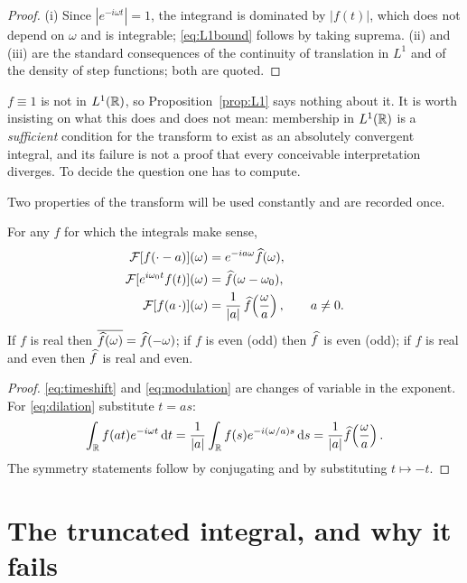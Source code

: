 \begin{proof}
(i) Since $|e^{-i\omega t}|=1$, the integrand is dominated by $|f(t)|$, which does not depend on
$\omega$ and is integrable; \eqref{eq:L1bound} follows by taking suprema. (ii) and (iii) are the
standard consequences of the continuity of translation in $L^{1}$ and of the density of step
functions; both are quoted.
\end{proof}

\begin{example}
$f\equiv 1$ is not in $L^{1}(\mathbb{R})$, so Proposition~\ref{prop:L1} says nothing about it. It is worth
insisting on what this does and does not mean: membership in $L^{1}(\mathbb{R})$ is a \emph{sufficient}
condition for the transform to exist as an absolutely convergent integral, and its failure is not
a proof that every conceivable interpretation diverges. To decide the question one has to compute.
\end{example}

Two properties of the transform will be used constantly and are recorded once.

\begin{proposition}\label{prop:symmetries}
For any $f$ for which the integrals make sense,
\begin{align}
\mathcal{F}[f(\cdot-a)](\omega)&=e^{-ia\omega}\widehat{f}(\omega), \label{eq:timeshift}\\
\mathcal{F}[e^{i\omega_{0}t}f(t)](\omega)&=\widehat{f}(\omega-\omega_{0}), \label{eq:modulation}\\
\mathcal{F}[f(a\,\cdot)](\omega)&=\frac{1}{|a|}\,\widehat{f}\!\left(\frac{\omega}{a}\right),\qquad a\neq0.
\label{eq:dilation}
\end{align}
If $f$ is real then $\overline{\widehat{f}(\omega)}=\widehat{f}(-\omega)$; if $f$ is even (odd) then $\widehat{f}$ is even
(odd); if $f$ is real and even then $\widehat{f}$ is real and even.
\end{proposition}

\begin{proof}
\eqref{eq:timeshift} and \eqref{eq:modulation} are changes of variable in the exponent.
For \eqref{eq:dilation} substitute $t=as$:
\begin{equation}
\int_{\mathbb{R}}f(at)e^{-i\omega t}\,\mathrm{d} t
=\frac{1}{|a|}\int_{\mathbb{R}}f(s)e^{-i(\omega/a)s}\,\mathrm{d} s
=\frac{1}{|a|}\widehat{f}\!\left(\frac{\omega}{a}\right).
\end{equation}
The symmetry statements follow by conjugating and by substituting $t\mapsto-t$.
\end{proof}

\section{The truncated integral, and why it fails}

